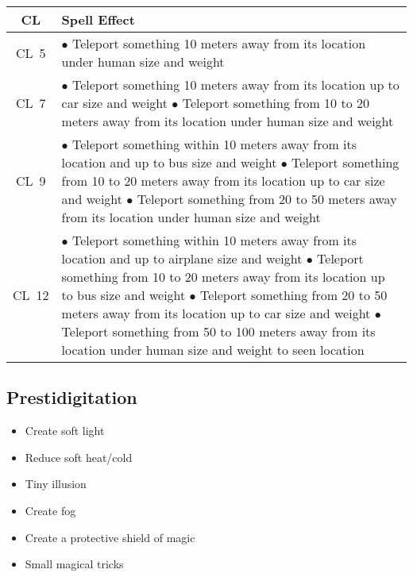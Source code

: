 \begin{center}
    \begin{tabular}{|c m{}|} 
      \hline
      \textbf{CL} & \textbf{Spell Effect} \\ 
      \hline
      CL~5 & 
        $\bullet$ Teleport something 10 meters away from its location under human size and weight \\ \hline
      CL~7 & 
        $\bullet$ Teleport something 10 meters away from its location up to car size and weight \newline
        $\bullet$ Teleport something from 10 to 20 meters away from its location under human size and weight \\ \hline
      CL~9 & 
        $\bullet$ Teleport something within 10 meters away from its location and up to bus size and weight \newline
        $\bullet$ Teleport something from 10 to 20 meters away from its location up to car size and weight \newline
        $\bullet$ Teleport something from 20 to 50 meters away from its location under human size and weight \\ \hline
      CL~12 &
        $\bullet$ Teleport something within 10 meters away from its location and up to airplane size and weight \newline
        $\bullet$ Teleport something from 10 to 20 meters away from its location up to bus size and weight \newline
        $\bullet$ Teleport something from 20 to 50 meters away from its location up to car size and weight \newline
        $\bullet$ Teleport something from 50 to 100 meters away from its location under human size and weight to seen location \\
      \hline
    \end{tabular}
\end{center}

\subsection{Prestidigitation}

\begin{itemize}
    \item Create soft light
    \item Reduce soft heat/cold
    \item Tiny illusion
    \item Create fog
    \item Create a protective shield of magic
    \item Small magical tricks
\end{itemize}

